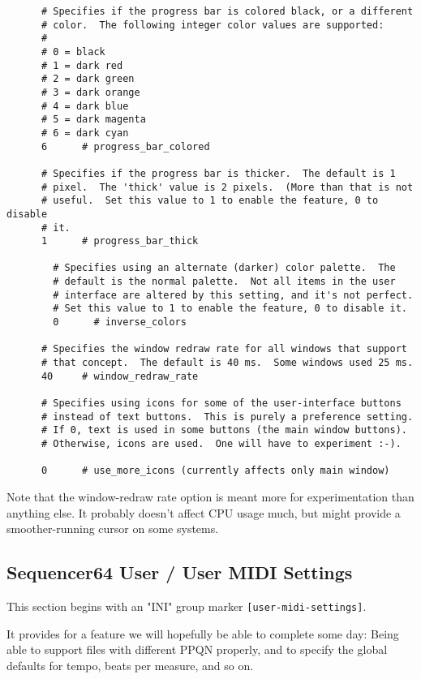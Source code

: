    \begin{verbatim}
      # Specifies if the progress bar is colored black, or a different
      # color.  The following integer color values are supported:
      # 
      # 0 = black
      # 1 = dark red
      # 2 = dark green
      # 3 = dark orange
      # 4 = dark blue
      # 5 = dark magenta
      # 6 = dark cyan
      6      # progress_bar_colored

      # Specifies if the progress bar is thicker.  The default is 1
      # pixel.  The 'thick' value is 2 pixels.  (More than that is not
      # useful.  Set this value to 1 to enable the feature, 0 to disable
      # it.
      1      # progress_bar_thick

		# Specifies using an alternate (darker) color palette.  The
		# default is the normal palette.  Not all items in the user
		# interface are altered by this setting, and it's not perfect.
		# Set this value to 1 to enable the feature, 0 to disable it.
		0      # inverse_colors

      # Specifies the window redraw rate for all windows that support
      # that concept.  The default is 40 ms.  Some windows used 25 ms.
      40     # window_redraw_rate

      # Specifies using icons for some of the user-interface buttons
      # instead of text buttons.  This is purely a preference setting.
      # If 0, text is used in some buttons (the main window buttons).
      # Otherwise, icons are used.  One will have to experiment :-).

      0      # use_more_icons (currently affects only main window)
   \end{verbatim}

   Note that the window-redraw rate option is meant more for experimentation
   than anything else.  It probably doesn't affect CPU usage much, but might
   provide a smoother-running cursor on some systems.

\subsection{Sequencer64 User / User MIDI Settings}
\label{subsec:seq64_usr_file_user_midi_settings}

   This section begins with an
   "INI" group marker \texttt{[user-midi-settings]}.

   It provides for a feature we will hopefully be able to complete some day:
   Being able to support files with different PPQN properly, and to specify the
   global defaults for tempo, beats per measure, and so on.

